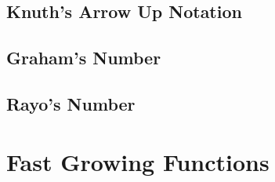 







\subsection{Knuth's Arrow Up Notation}

\subsection{Graham's Number}


\subsection{Rayo's Number}





\section{Fast Growing Functions}




